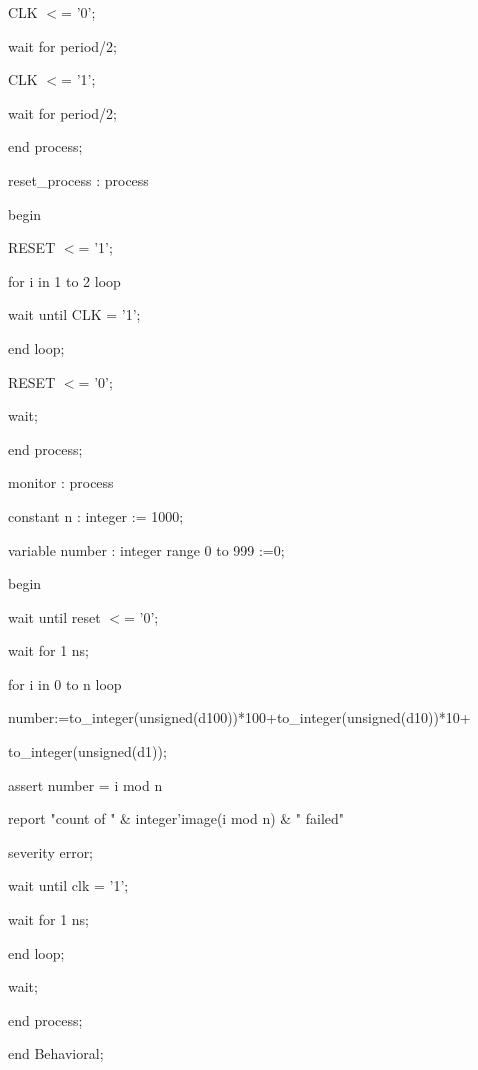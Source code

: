 \documentclass{article} %
\begin{document}
\noindent         CLK $\mathrm{<}$= '0';

\noindent         wait for period/2;

\noindent         CLK $\mathrm{<}$= '1';

\noindent         wait for period/2;

\noindent     end process;

\noindent

\noindent     reset\_process : process

\noindent     begin

\noindent         RESET $\mathrm{<}$= '1';

\noindent         for i in 1 to 2 loop

\noindent             wait until CLK = '1';

\noindent         end loop;

\noindent         RESET $\mathrm{<}$= '0';

\noindent         wait;

\noindent     end process;

\noindent

\noindent     monitor : process

\noindent     constant n : integer := 1000;

\noindent     variable number : integer range 0 to 999 :=0;

\noindent     begin

\noindent         wait until reset $\mathrm{<}$= '0';

\noindent         wait for 1 ns;

\noindent         for i in 0 to n loop

number:=to\_integer(unsigned(d100))*100+to\_integer(unsigned(d10))*10+

to\_integer(unsigned(d1));

\noindent             assert number = i mod n

\noindent             report "count of " \& integer'image(i mod n) \& " failed"

\noindent             severity error;

\noindent             wait until clk = '1';

\noindent             wait for 1 ns;

\noindent         end loop;

\noindent         wait;

\noindent     end process;

\noindent end Behavioral;
\end{document}

